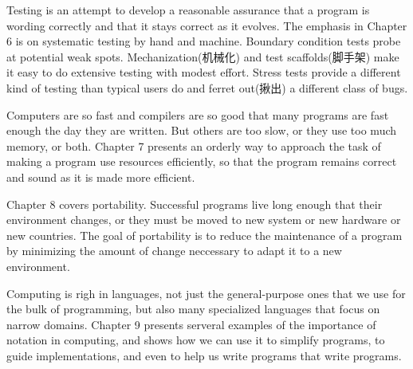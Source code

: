 Testing is an attempt to develop a reasonable assurance that a program is
wording correctly and that it stays correct as it evolves. The emphasis in
Chapter 6 is on systematic testing by hand and machine. Boundary condition
tests probe at potential weak spots. Mechanization(机械化) and test
scaffolds(脚手架) make it easy to do extensive testing with modest effort.
Stress tests provide a different kind of testing than typical users do and
ferret out(揪出) a different class of bugs.

Computers are so fast and compilers are so good that many programs are fast
enough the day they are written. But others are too slow, or they use too
much memory, or both. Chapter 7 presents an orderly way to approach the
task of making a program use resources efficiently, so that the program
remains correct and sound as it is made more efficient.

Chapter 8 covers portability. Successful programs live long enough that
their environment changes, or they must be moved to new system or new
hardware or new countries. The goal of portability is to reduce the
maintenance of a program by minimizing the amount of change neccessary to
adapt it to a new environment.

Computing is righ in languages, not just the general-purpose ones that we
use for the bulk of programming, but also many specialized languages that
focus on narrow domains. Chapter 9 presents serveral examples of the
importance of notation in computing, and shows how we can use it to
simplify programs, to guide implementations, and even to help us write
programs that write programs.

